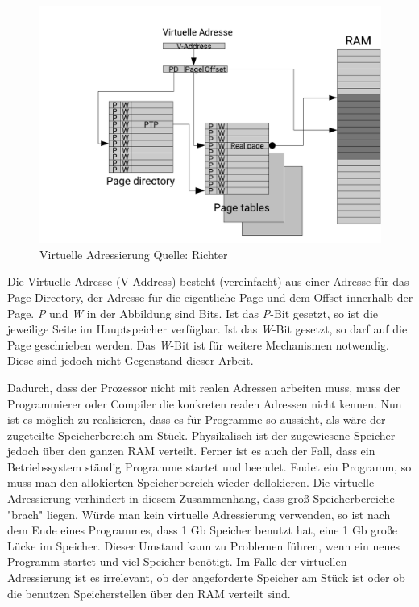 \begin{figure}
\includegraphics[scale=0.3]{bilder/mmu} 
\caption{Virtuelle Adressierung Quelle: Richter}
\label{MMU}
\end{figure}

Die Virtuelle Adresse (V-Address) besteht (vereinfacht) aus einer Adresse für das Page Directory, der Adresse für die eigentliche Page und dem Offset innerhalb der Page. \textit{P} und \textit{W} in der Abbildung sind Bits. Ist das \textit{P}-Bit gesetzt, so ist die jeweilige Seite im Hauptspeicher verfügbar. Ist das \textit{W}-Bit gesetzt, so darf auf die Page geschrieben werden. Das \textit{W}-Bit ist für weitere Mechanismen notwendig. Diese sind jedoch nicht Gegenstand dieser Arbeit.  

Dadurch, dass der Prozessor nicht mit realen Adressen arbeiten muss, muss der Programmierer oder Compiler die konkreten realen Adressen nicht kennen. Nun ist es möglich zu realisieren, dass es für Programme so aussieht, als wäre der zugeteilte Speicherbereich am Stück. Physikalisch ist der zugewiesene Speicher jedoch über den ganzen RAM verteilt. Ferner ist es auch der Fall, dass ein Betriebssystem ständig Programme startet und beendet. Endet ein Programm, so muss man den allokierten   Speicherbereich wieder dellokieren. Die virtuelle Adressierung verhindert in diesem Zusammenhang, dass groß Speicherbereiche "brach" liegen. Würde man kein virtuelle Adressierung verwenden, so ist nach dem Ende eines Programmes, dass 1 Gb Speicher benutzt hat, eine 1 Gb große Lücke im Speicher. Dieser Umstand kann zu Problemen führen, wenn ein neues Programm startet und viel Speicher benötigt. Im Falle der virtuellen Adressierung ist es irrelevant, ob der angeforderte Speicher am Stück ist oder ob die benutzen Speicherstellen über den RAM verteilt sind.    

